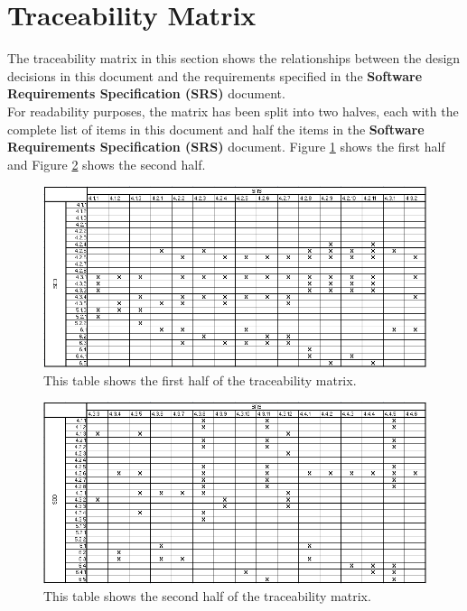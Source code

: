 \documentclass[11pt]{article}
\begin{document}
\section{Traceability Matrix}\label{section-trace-matrix}
The traceability matrix in this section shows the relationships between the design decisions in this document and the requirements specified in the \textbf{Software Requirements Specification (SRS)} document.\\
For readability purposes, the matrix has been split into two halves, each with the complete list of items in this document and half the items in the \textbf{Software Requirements Specification (SRS)} document. Figure \ref{tbl-trace-1} shows the first half and Figure \ref{tbl-trace-2} shows the second half.
\begin{figure}[H]
\centering
\includegraphics[width=6in]{./images/trace_matrix_1.png}
\caption[Traceability Matrix Part 1]{This table shows the first half of the traceability matrix.}
\label{tbl-trace-1}
\end{figure}
\begin{figure}[H]
\centering
\includegraphics[width=6in]{./images/trace_matrix_2.png}
\caption[Traceability Matrix Part 1]{This table shows the second half of the traceability matrix.}
\label{tbl-trace-2}
\end{figure}
\newpage
\end{document}
